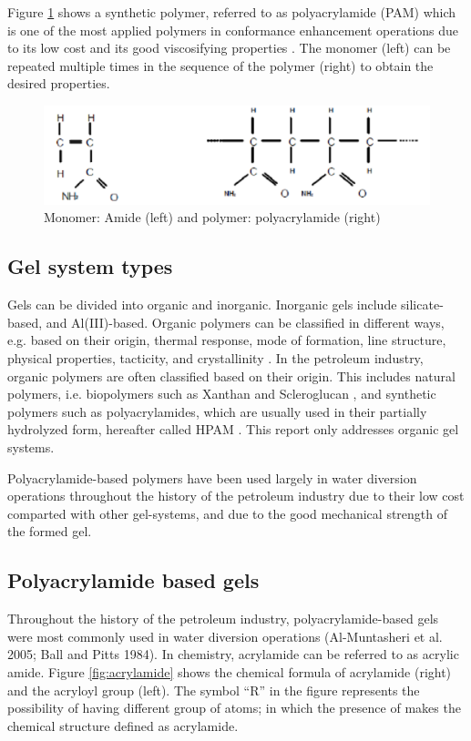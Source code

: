 Figure \ref{fig:polymonomer} shows a synthetic polymer, referred to as polyacrylamide (PAM) which is one of the most applied polymers in conformance enhancement operations due to its low cost and its good viscosifying properties \citep{Kabir2001}. The monomer (left) can be repeated multiple times in the sequence of the polymer (right) to obtain the desired properties.

\begin{figure}
    \centering
    \includegraphics[width=\textwidth]{img/fig/polymonomer.png}
    \caption{Monomer: Amide (left) and polymer: polyacrylamide (right) \citep{Kabir2001}}
    \label{fig:polymonomer} %
\end{figure}

\subsection{Gel system types}

Gels can be divided into organic and inorganic. Inorganic gels include silicate-based, and Al(III)-based. Organic polymers can be classified in different ways, e.g. based on their origin, thermal response, mode of formation, line structure, physical properties, tacticity, and crystallinity \citep{Ghosh2006}. In the petroleum industry, organic polymers are often classified based on their origin. This includes natural polymers, i.e. biopolymers such as Xanthan and Scleroglucan \citep{Al-Muntasheri2012}, and synthetic polymers such as polyacrylamides, which are usually used in their partially hydrolyzed form, hereafter called HPAM \citep{Finch1992}. This report only addresses organic gel systems.

Polyacrylamide-based polymers have been used largely in water diversion operations throughout the history of the petroleum industry due to their low cost comparted with other gel-systems, and due to the good mechanical strength of the formed gel. 

\subsection{Polyacrylamide based gels \label{sec:PolyacrylamideGels}} 
Throughout the history of the petroleum industry, polyacrylamide-based gels were most commonly used in water diversion operations \citep{Al-Muntasheri2005, Ball1984} (Al-Muntasheri et al. 2005; Ball and Pitts 1984). In chemistry, acrylamide can be referred to as acrylic amide. Figure \ref{fig:acrylamide} shows the chemical formula of acrylamide (right) and the acryloyl group (left). The symbol “R” in the figure represents the possibility of having different group of atoms; in which the presence of  makes the chemical structure defined as acrylamide.

